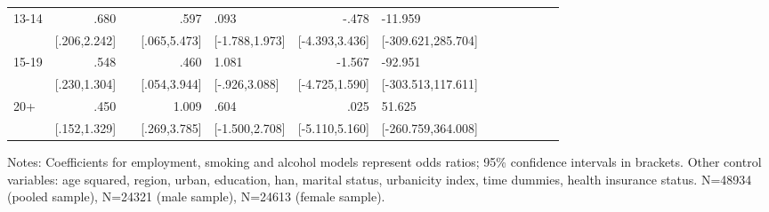 \begin{table}[hp]
\begin{adjustbox}{max width=\linewidth}
\begin{threeparttable}
{\begin{tabular}{l*{6}{D{.}{.}{-1}l}}
13-14           &            .680&                &            .597&            .093&           -.478&         -11.959\\
                &    [.206,2.242]&                &    [.065,5.473]&  [-1.788,1.973]&  [-4.393,3.436]&[-309.621,285.704]\\

15-19           &            .548&                &            .460&           1.081&          -1.567&         -92.951\\
                &    [.230,1.304]&                &    [.054,3.944]&   [-.926,3.088]&  [-4.725,1.590]&[-303.513,117.611]\\

20+             &            .450&                &           1.009&            .604&            .025&          51.625\\
                &    [.152,1.329]&                &    [.269,3.785]&  [-1.500,2.708]&  [-5.110,5.160]&[-260.759,364.008]\\           
\bottomrule
\end{tabular}
\begin{tablenotes}
\item Notes: Coefficients for employment, smoking and alcohol models represent odds ratios;  95\% confidence intervals in brackets. Other control variables: age squared, region, urban, education, han, marital status, urbanicity index, time dummies, health insurance status. N=48934 (pooled sample), N=24321 (male sample), N=24613 (female sample).
\end{tablenotes}
}
\end{threeparttable}
\end{adjustbox}
\end{table}

